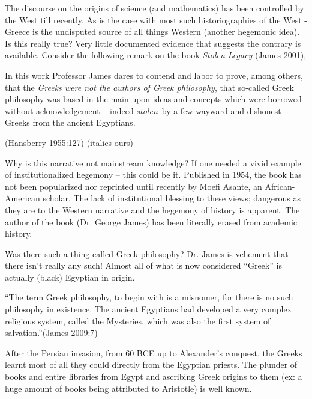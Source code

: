 The discourse on the origins of science (and mathematics) has been controlled by the West till recently. As is the case with most such historiographies of the West - Greece is the undisputed source of all things Western (another hegemonic idea). Is this really true? Very little documented evidence that suggests the contrary is available. Consider the following remark on the book \textit{Stolen Legacy} (James 2001),

\begin{myquote}
In this work Professor James dares to contend and labor to prove, among others, that the \textit{Greeks were not the authors of Greek philosophy}, that so-called Greek philosophy was based in the main upon ideas and concepts which were borrowed without acknowledgement -- indeed \textit{stolen}--by a few wayward and dishonest Greeks from the ancient Egyptians.
\end{myquote}

\hfill (Hansberry 1955:127) (italics ours)

Why is this narrative not mainstream knowledge? If one needed a vivid example of institutionalized hegemony – this could be it. Published in 1954, the book has not been popularized nor reprinted until recently by Moefi Asante, an African-American scholar. The lack of institutional blessing to these views; dangerous as they are to the Western narrative and the hegemony of history is apparent. The author of the book (Dr. George James) has been literally erased from academic history.

Was there such a thing called Greek philosophy? Dr. James is vehement that there isn’t really any such! Almost all of what is now considered “Greek” is actually (black) Egyptian in origin.

\begin{myquote}
“The term Greek philosophy, to begin with is a misnomer, for there is no such philosophy in existence. The ancient Egyptians had developed a very complex religious system, called the Mysteries, which was also the first system of salvation.”\hfill (James 2009:7)
\end{myquote}

After the Persian invasion, from 60 BCE up to Alexander’s conquest, the Greeks learnt most of all they could directly from the Egyptian priests. The plunder of books and entire libraries from Egypt and ascribing Greek origins to them (ex: a huge amount of books being attributed to Aristotle) is well known.

